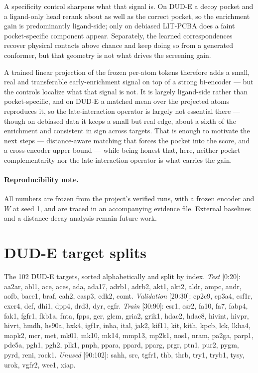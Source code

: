 \documentclass[10pt,letterpaper,twocolumn]{article}
\begin{document}
A specificity control sharpens what that signal is. On DUD-E a decoy pocket and a ligand-only head rerank about as well as the correct pocket, so the enrichment gain is predominantly ligand-side; only on debiased LIT-PCBA does a faint pocket-specific component appear. Separately, the learned correspondences recover physical contacts above chance and keep doing so from a generated conformer, but that geometry is not what drives the screening gain.

A trained linear projection of the frozen per-atom tokens therefore adds a small, real and transferable early-enrichment signal on top of a strong bi-encoder --- but the controls localize what that signal is not. It is largely ligand-side rather than pocket-specific, and on DUD-E a matched mean over the projected atoms reproduces it, so the late-interaction operator is largely not essential there --- though on debiased data it keeps a small but real edge, about a sixth of the enrichment and consistent in sign across targets. That is enough to motivate the next steps --- distance-aware matching that forces the pocket into the score, and a cross-encoder upper bound --- while being honest that, here, neither pocket complementarity nor the late-interaction operator is what carries the gain.

\paragraph{Reproducibility note.} All numbers are frozen from the project's verified runs, with a frozen encoder and $W$ at seed 1, and are traced in an accompanying evidence file. External baselines and a distance-decay analysis remain future work.

\appendix

\section{DUD-E target splits}
\label{app:splits}
The 102 DUD-E targets, sorted alphabetically and split by index.
\emph{Test} [0:20]: aa2ar, abl1, ace, aces, ada, ada17, adrb1, adrb2, akt1, akt2, aldr, ampc, andr, aofb, bace1, braf, cah2, casp3, cdk2, comt.
\emph{Validation} [20:30]: cp2c9, cp3a4, csf1r, cxcr4, def, dhi1, dpp4, drd3, dyr, egfr.
\emph{Train} [30:90]: esr1, esr2, fa10, fa7, fabp4, fak1, fgfr1, fkb1a, fnta, fpps, gcr, glcm, gria2, grik1, hdac2, hdac8, hivint, hivpr, hivrt, hmdh, hs90a, hxk4, igf1r, inha, ital, jak2, kif11, kit, kith, kpcb, lck, lkha4, mapk2, mcr, met, mk01, mk10, mk14, mmp13, mp2k1, nos1, nram, pa2ga, parp1, pde5a, pgh1, pgh2, plk1, pnph, ppara, ppard, pparg, prgr, ptn1, pur2, pygm, pyrd, reni, rock1.
\emph{Unused} [90:102]: sahh, src, tgfr1, thb, thrb, try1, tryb1, tysy, urok, vgfr2, wee1, xiap.
\end{document}
